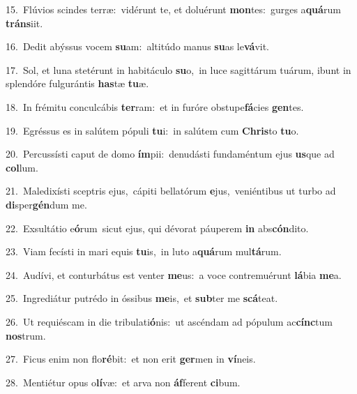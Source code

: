 {\numbfont\textcolor{\numbcolor}{15.}}~Flúvios scindes terræ:~\dagger vidérunt te, et doluérunt \textbf{mon}\-tes:~\star gurges a\-\textbf{quá}\-rum \textbf{tráns}\-iit.\par
{\numbfont\textcolor{\numbcolor}{16.}}~Dedit abýssus vocem \textbf{su}\-am:~\star altitúdo manus \textbf{su}\-as le\-\textbf{vá}\-vit.\par
{\numbfont\textcolor{\numbcolor}{17.}}~Sol, et luna stetérunt in habitáculo \textbf{su}\-o,~\star in luce sagittárum tuárum, ibunt in splendóre fulgurántis \textbf{has}\-tæ \textbf{tu}\-æ.\par
{\numbfont\textcolor{\numbcolor}{18.}}~In frémitu conculcábis \textbf{ter}\-ram:~\star et in furóre obstupe\-\textbf{fá}\-cies \textbf{gen}\-tes.\par
{\numbfont\textcolor{\numbcolor}{19.}}~Egréssus es in salútem pópuli \textbf{tu}\-i:~\star in salútem cum \textbf{Chris}\-to \textbf{tu}\-o.\par
{\numbfont\textcolor{\numbcolor}{20.}}~Percussísti caput de domo \textbf{ím}\-pii:~\star denudásti fundaméntum ejus \textbf{us}\-que ad \textbf{col}\-lum.\par
{\numbfont\textcolor{\numbcolor}{21.}}~Maledixísti sceptris ejus,~\dagger cápiti bellatórum \textbf{e}\-jus,~\star veniéntibus ut turbo ad \textbf{di}\-sper\-\textbf{gén}\-dum me.\par
{\numbfont\textcolor{\numbcolor}{22.}}~Exsultátio e\-\textbf{ó}\-rum~\star sicut ejus, qui dévorat páuperem \textbf{in} abs\-\textbf{cón}\-dito.\par
{\numbfont\textcolor{\numbcolor}{23.}}~Viam fecísti in mari equis \textbf{tu}\-is,~\star in luto a\-\textbf{quá}\-rum mul\-\textbf{tá}\-rum.\par
{\numbfont\textcolor{\numbcolor}{24.}}~Audívi, et conturbátus est venter \textbf{me}\-us:~\star a voce contremuérunt \textbf{lá}\-bia \textbf{me}\-a.\par
{\numbfont\textcolor{\numbcolor}{25.}}~Ingrediátur putrédo in óssibus \textbf{me}\-is,~\star et \textbf{sub}\-ter me \textbf{scá}\-teat.\par
{\numbfont\textcolor{\numbcolor}{26.}}~Ut requiéscam in die tribulati\-\textbf{ó}\-nis:~\star ut ascéndam ad pópulum ac\-\textbf{cínc}\-tum \textbf{nos}\-trum.\par
{\numbfont\textcolor{\numbcolor}{27.}}~Ficus enim non flo\-\textbf{ré}\-bit:~\star et non erit \textbf{ger}\-men in \textbf{ví}\-neis.\par
{\numbfont\textcolor{\numbcolor}{28.}}~Mentiétur opus o\-\textbf{lí}\-væ:~\star et arva non \textbf{áf}\-ferent \textbf{ci}\-bum.\par

